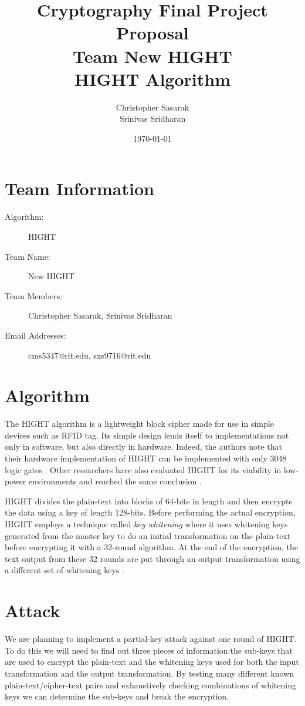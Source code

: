 \documentclass[letterpaper,notitlepage]{article}
\title{Cryptography Final Project Proposal\\ Team New HIGHT\\ HIGHT Algorithm}
\author{Christopher Sasarak\\ Srinivas Sridharan}
\date{\today}
\begin{document}
\maketitle
\thispagestyle{empty}

\section*{Team Information}
\begin{description}
    \item[Algorithm:] HIGHT
    \item[Team Name:] New HIGHT
    \item[Team Members:] Christopher Sasarak, Srinivas Sridharan   
    \item[Email Addresses:] cms5347@rit.edu, sxs9716@rit.edu
\end{description}

\section*{Algorithm}
The HIGHT algorithm\cite{hight} is a lightweight block cipher made for use in simple devices
such as RFID tag. Its simple design lends itself to implementations
not only in software, but also directly in hardware. Indeed, the authors note 
that their hardware implementation of HIGHT can be implemented with only 3048 logic
gates \cite{hight}. Other researchers have also evaluated HIGHT for its viability
in low-power environments and reached the same conclusion 
\cite{hight_implementation}.

HIGHT divides the plain-text into blocks of 64-bits in length and then encrypts
the data using a key of length 128-bits. Before performing the actual encryption, 
HIGHT employs a technique called \emph{key whitening} where it uses whitening
keys generated from the master key to do an initial transformation on the 
plain-text before encrypting it with a 32-round algorithm. At the end of the
encryption, the text output from these 32 rounds are put through an output
transformation using a different set of whitening keys \cite{hight}.

\section*{Attack}
We are planning to implement a partial-key attack against one round of HIGHT.
To do this we will need to find out three pieces of information:the sub-keys that 
are used to encrypt the plain-text and the whitening keys used for both the
input transformation and the output transformation. By testing many different 
known plain-text/cipher-text pairs and exhaustively checking combinations of 
whitening keys we can determine the sub-keys and break the encryption.




\end{document}
